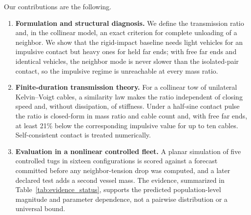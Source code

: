 Our contributions are the following.
\begin{enumerate}
    \item \textbf{Formulation and structural diagnosis.}
    We define the transmission ratio and, in the collinear model, an exact criterion for complete unloading of a neighbor. We show that the rigid-impact baseline needs light vehicles for an impulsive contact but heavy ones for held far ends; with free far ends and identical vehicles, the neighbor mode is never slower than the isolated-pair contact, so the impulsive regime is unreachable at every mass ratio.

    \item \textbf{Finite-duration transmission theory.}
    For a collinear tow of unilateral Kelvin--Voigt cables, a similarity law makes the ratio independent of closing speed and, without dissipation, of stiffness. Under a half-sine contact pulse the ratio is closed-form in mass ratio and cable count and, with free far ends, at least 21\% below the corresponding impulsive value for up to ten cables. Self-consistent contact is treated numerically.

    \item \textbf{Evaluation in a nonlinear controlled fleet.}
    A planar simulation of five controlled tugs in sixteen configurations is scored against a forecast committed before any neighbor-tension drop was computed, and a later declared test adds a second vessel mass. The evidence, summarized in Table~\ref{tab:evidence_status}, supports the predicted population-level magnitude and parameter dependence, not a pairwise distribution or a universal bound.
\end{enumerate}
